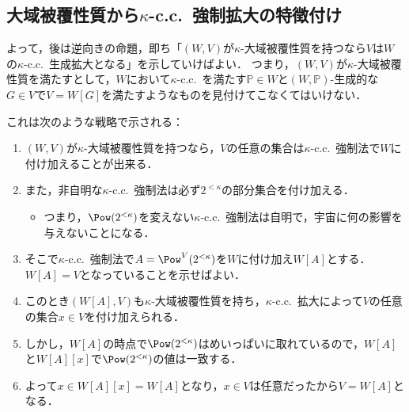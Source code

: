 \documentclass[a4j,leqno]{ltjsarticle}
\newcommand{\cc}{c.c.\ }
\begin{document}
\subsection{大域被覆性質から$\kappa$-\cc{}強制拡大の特徴付け}
よって，後は逆向きの命題，即ち「$(W, V)$が$\kappa$-大域被覆性質を持つなら$V$は$W$の$\kappa$-\cc{}生成拡大となる」を示していけばよい．
つまり，$(W, V)$が$\kappa$-大域被覆性質を満たすとして，$W$において$\kappa$-\cc{}を満たす$\mathbb{P} \in W$と$(W, \mathbb{P})$-生成的な$G \in V$で$V = W[G]$を満たすようなものを見付けてこなくてはいけない．

これは次のような戦略で示される：

\begin{enumerate}
 \item\label{item:global-covering-to-k-cc} $(W, V)$が$\kappa$-大域被覆性質を持つなら，$V$の任意の集合は$\kappa$-\cc{}強制法で$W$に付け加えることが出来る．
 \item\label{item:nontriv-adds-2-kappa} また，非自明な$\kappa$-\cc{}強制法は必ず$2^{<\kappa}$の部分集合を付け加える．
 \begin{itemize}
  \item つまり，$\Pow(2^{<\kappa})$を変えない$\kappa$-\cc{}強制法は自明で，宇宙に何の影響を与えないことになる．
 \end{itemize}
 \item そこで$\kappa$-\cc{}強制法で$A = \Pow^{V}(2^{<\kappa})$を$W$に付け加え$W[A]$とする．
       $W[A] = V$となっていることを示せばよい．
 \item このとき$(W[A], V)$も$\kappa$-大域被覆性質を持ち，$\kappa$-\cc{}拡大によって$V$の任意の集合$x \in V$を付け加えられる．
 \item しかし，$W[A]$の時点で$\Pow(2^{<\kappa})$はめいっぱいに取れているので，$W[A]$と$W[A][x]$で$\Pow(2^{<\kappa})$の値は一致する．
 \item よって$x \in W[A][x] = W[A]$となり，$x \in V$は任意だったから$V = W[A]$となる．
\end{enumerate}
\end{document}
